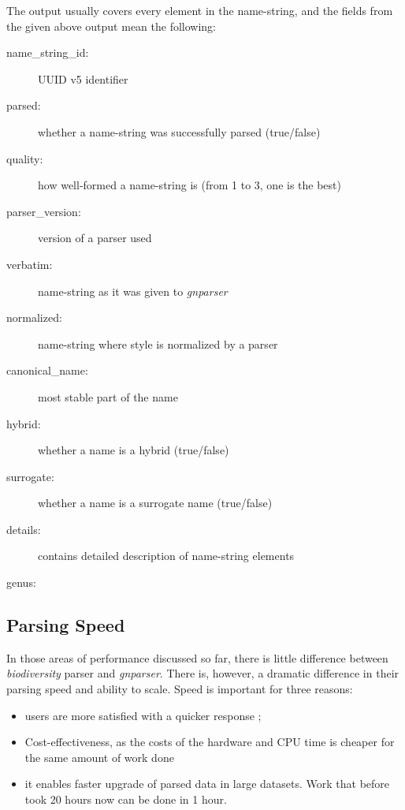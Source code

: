 \documentclass{bmcart}
\begin{document}

The output usually covers every element in the name-string, and the fields from
the given above output mean the following:

\begin{description}
  \item[name\_string\_id:] UUID v5 identifier
  \item[parsed:] whether a name-string was successfully parsed (true/false)
  \item[quality:] how well-formed a name-string is (from 1 to 3, one is the
    best)
  \item[parser\_version:] version of a parser used
  \item[verbatim:] name-string as it was given to \textit{gnparser}
  \item[normalized:] name-string where style is normalized by a parser
  \item[canonical\_name:] most stable part of the name
  \item[hybrid:] whether a name is a hybrid (true/false)
  \item[surrogate:] whether a name is a surrogate name (true/false)
  \item[details:] contains detailed description of name-string elements
  \item[genus:]

\end{description}



\subsection*{Parsing Speed}

In those areas of performance discussed so far, there is little difference
between \textit{biodiversity} parser and \textit{gnparser}. There is, however,
a dramatic difference in their parsing speed and ability to scale. Speed is important for three reasons:


\begin{itemize}

  \item users are more satisfied with a quicker response ;

  \item Cost-effectiveness, as the costs of the hardware and CPU time is cheaper for the same amount of work done

  \item it enables faster upgrade of parsed data in large datasets. Work that before took 20 hours now can be done in 1 hour.
\end{itemize}
\end{document}
